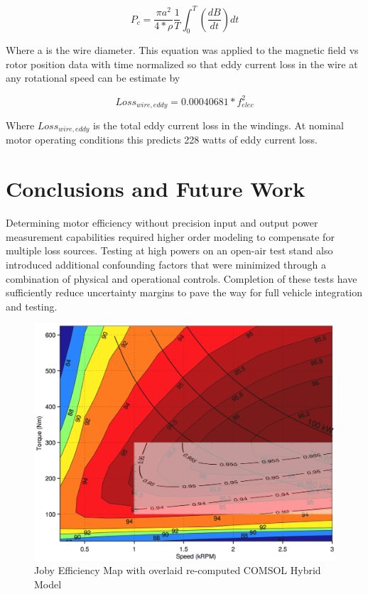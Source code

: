 \documentclass[]{aiaa-tc}%
\begin{document}
\begin{equation}
P_{c} = \frac{\pi a^2}{4*\rho}\frac{1}{T}\int_{0}^{T}(\frac{dB}{dt})dt
\label{eq:EddyLoss3}
\end{equation}

Where a is the wire diameter. This equation was applied to the magnetic field vs rotor position data with time normalized so that eddy current loss in the wire at any rotational speed can be estimate by

\begin{equation}
Loss_{wire,eddy} = 0.00040681*f_{elec}^{2}
\label{eq:EddyLoss4}
\end{equation}

Where $Loss_{wire,eddy}$ is the total eddy current loss in the windings. At nominal motor operating conditions this predicts 228 watts of eddy current loss.


\section{Conclusions and Future Work}

Determining motor efficiency without precision input and output power measurement capabilities required higher order modeling to compensate for multiple loss sources. 
Testing at high powers on an open-air test stand also introduced additional confounding factors that were minimized through a combination of physical and operational controls.
Completion of these tests have sufficiently reduce uncertainty margins to pave the way for full vehicle integration and testing.

\begin{figure}[!htb]%
	\centering
    \includegraphics[width=1.0\textwidth]{figures/map_compare.png}
	\caption{Joby Efficiency Map with overlaid re-computed COMSOL Hybrid Model}
	\label{fig:map}
\end{figure}
\end{document}
